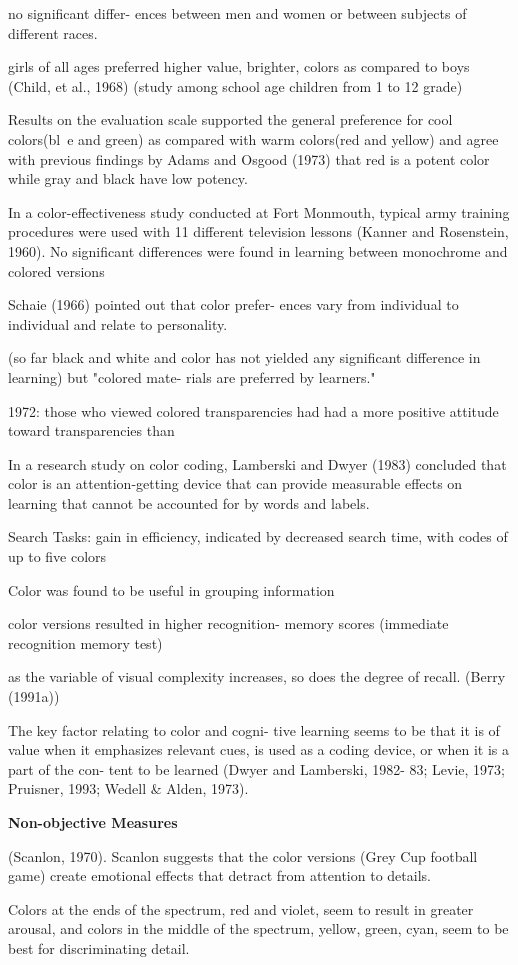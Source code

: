 no significant differ- ences between men and women or between subjects of different races.\cite{Pert1996}

girls of all ages preferred higher value, brighter, colors as compared to boys (Child, et al., 1968) \cite{Pert1996} (study among school age children from 1 to 12 grade)

Results on the evaluation scale supported the general preference for cool colors(bl~e and green) as compared with warm colors(red and yellow) and agree with previous findings by Adams and Osgood (1973) that red is a potent color while gray and black have low potency. \cite{Pert1996}

In a color-effectiveness study conducted at Fort Monmouth, typical army training procedures were used with 11 different television lessons (Kanner and Rosenstein, 1960). No significant
differences were found in learning between
monochrome and colored versions \cite{Pert1996}

Schaie (1966) pointed out that color prefer-
ences vary from individual to individual and relate to personality. \cite{Pert1996}

(so far black and white and color has not yielded any significant difference in learning) but "colored mate- rials are preferred by learners." \cite{Pert1996}

1972: those who viewed colored transparencies had had a more positive attitude toward transparencies than \cite{Pert1996}

In a research study on color coding, Lamberski and Dwyer (1983) concluded that color is an attention-getting device that can provide measurable effects on learning that cannot be accounted for by words and labels. \cite{Pert1996}

Search Tasks: 
gain in efficiency, indicated by decreased search time, with codes of up to five colors \cite{Pert1996}

Color was found to be useful in grouping information

color versions resulted in higher recognition- memory scores (immediate recognition memory test)\cite{Pert1996}

as the variable of visual complexity increases, so does the degree of recall. (Berry (1991a)) \cite{Pert1996}

The key factor relating to color and cogni-
tive learning seems to be that it is of value when it emphasizes relevant cues, is used as a coding device, or when it is a part of the con- tent to be learned (Dwyer and Lamberski, 1982- 83; Levie, 1973; Pruisner, 1993; Wedell \& Alden, 1973). \cite{Pert1996}

\textbf{Non-objective Measures}

(Scanlon, 1970). Scanlon suggests that the color versions (Grey Cup football game) create emotional effects that detract from attention to details.







Colors at the ends of the spectrum, red and
violet, seem to result in greater arousal, and
colors in the middle of the spectrum, yellow,
green, cyan, seem to be best for discriminating
detail. \cite{Pert1996}